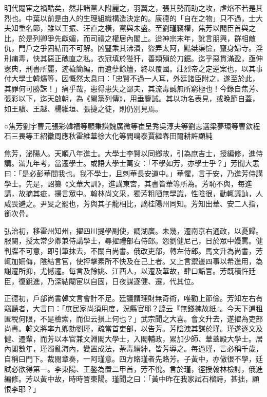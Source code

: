 
\begin{pinyinscope}
明代閹宦之禍酷矣，然非諸黨人附麗之，羽翼之，張其勢而助之攻，虐焰不若是其烈也。中葉以前是由人的生理組織構造決定的。康德的「自在之物」只不過，士大夫知重名節，雖以王振、汪直之橫，黨與未盛。至劉瑾竊權，焦芳以閣臣首與之比，於是列卿爭先獻媚，而司禮之權居內閣上。迨神宗末年，訛言朋興，群相敵仇，門戶之爭固結而不可解。凶豎乘其沸潰，盜弄太阿，黠桀渠憸，竄身婦寺。淫刑痡毒，快其惡正醜直之私。衣冠填於狴犴，善類殞於刀鋸。迄乎惡貫滿盈，亟伸憲典，刑書所麗，迹穢簡編，而遺孽餘燼，終以覆國。莊烈帝之定逆案也，以其事付大學士韓爌等，因慨然太息曰：「忠賢不過一人耳，外廷諸臣附之，遂至於此，其罪何可勝誅！」痛乎哉，患得患失之鄙夫，其流毒誠無所窮極也！今錄自焦芳、張彩以下，迄天啟朝，為《閹黨列傳》，用垂鑒誡。其以功名表見，或晚節自蓋，如王驥、王越、楊維垣、張捷之徒，則仍別見焉。

○焦芳劉宇曹元張彩韓福等顧秉謙魏廣微等崔呈秀吳淳夫等劉志選梁夢環等曹欽程石三畏等王紹徽周應秋霍維華徐大化等閻鳴泰賈繼春田爾耕許顯純

焦芳，泌陽人。天順八年進士。大學士李賢以同鄉故，引為庶吉士，授編修，進侍講。滿九年考，當遷學士。或語大學士萬安：「不學如芳，亦學士乎？」芳聞大恚曰：「是必彭華間我也。我不學士，且刺華長安道中。」華懼，言于安，乃進芳侍講學士。先是，詔纂《文華大訓》，進講東宮，其書皆華等所為。芳恥不與，每進講，故摘其疵，揚言眾中。翰林尚文采，獨芳粗陋無學識，性陰很，動輒議訕，人咸畏避之。尹旻之罷也，芳與其子龍相比，謫桂陽州同知。芳知出華、安二人指，銜次骨。

弘治初，移霍州知州，擢四川提學副使，調湖廣。未幾，遷南京右通政，以憂歸。服闋，授太常少卿兼侍講學士，尋擢禮部右侍郎。怨劉健尼己，日於眾中嫚罵。健判牒不可意，即引筆抹去，不關白尚書。俄改吏部，轉左侍郎。馬文升為尚書，芳輒加姍侮，陰結言官，使抨擊素所不快及在己上者。又上言禦邊四事以希進用，為謝遷所抑，尤憾遷。每言及餘姚、江西人，以遷及華故，肆口詬詈。芳既積忤廷臣，復銳進，乃深結閹宦以自固，日夜謀逐健、遷，代其位。

正德初，戶部尚書韓文言會計不足。廷議謂理財無奇術，唯勸上節儉。芳知左右有竊聽者，大言曰：「庶民家尚須用度，況縣官耶？諺云『無錢揀故紙』。今天下逋租匿稅何限，不是檢索，而但云損上何也？」武宗聞之大喜。會文升去，遂擢為吏部尚書。韓文將率九卿劾劉瑾，疏當首吏部，以告芳。芳陰洩其謀於瑾。瑾遂逐文及健、遷輩，而芳以本官兼文淵閣大學士，入閣輔政，累加少師、華蓋殿大學士。居內閣數年，瑾濁亂海內，變置成法，荼毒縉紳，皆芳導之。每過瑾，言必稱千歲，自稱曰門下。裁閱章奏，一阿瑾意。四方賂瑾者先賂芳。子黃中，亦傲很不學，廷試必欲得第一。李東陽、王鏊為置二甲首，芳不悅。言於瑾，徑授翰林檢討，俄進編修。芳以黃中故，時時詈東陽。瑾聞之曰：「黃中昨在我家試石榴詩，甚拙，顧恨李耶？」


\end{pinyinscope}
